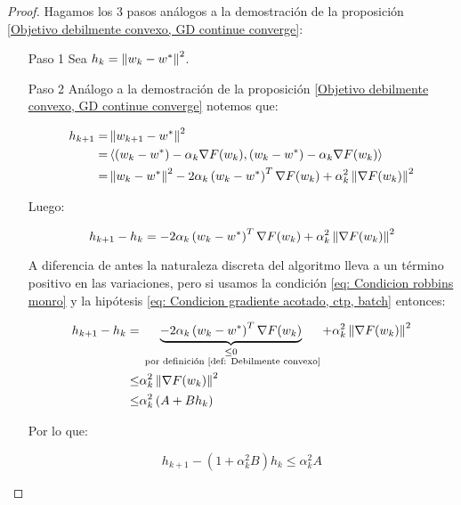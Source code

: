 \begin{proof}
	Hagamos los 3 pasos an\'alogos a la demostraci\'on de la proposici\'on \ref{Objetivo debilmente convexo, GD continue converge}:
	
	\begin{enumerate}
		\item [Paso 1] Sea $h_k = \left\lVert w_k - w^*\right\rVert^2$.
		\item [Paso 2] An\'alogo a la demostraci\'on de la proposici\'on \ref{Objetivo debilmente convexo, GD continue converge} notemos que:
		
		\begin{equation*}
			\begin{aligned}
			h_{k+1} = & \left\lVert w_{k+1} - w^*\right\rVert^2 \\
			 = & \left\langle\left(w_k - w^*\right) - \alpha_k \nabla F(w_k), \left(w_k - w^*\right) - \alpha_k \nabla F(w_k)\right\rangle \\
			 = & \left\lVert w_k - w^*\right\rVert^2 - 2  \alpha_k  \left(w_k - w^*\right)^T\nabla F(w_k) + \alpha_k^2 \left\lVert\nabla F(w_k)\right\rVert^2
			\end{aligned}
		\end{equation*}
		
		Luego:
		
		\begin{equation*}
			h_{k+1} - h_k = -2 \alpha_k \left(w_k - w^* \right)^T\nabla F(w_k) + \alpha_k^2 \left\lVert\nabla F(w_k)\right\rVert^2
		\end{equation*}
		
		A diferencia de antes la naturaleza discreta del algoritmo lleva a un t\'ermino positivo en las variaciones, pero si usamos la condici\'on \ref{eq: Condicion robbins monro} y la hip\'otesis \ref{eq: Condicion gradiente acotado, ctp, batch} entonces:
		
		\begin{equation*}
		\begin{aligned}
			h_{k+1} - h_k = & \underbrace{-2 \alpha_k \left(w_k - w^* \right)^T\nabla F(w_k)}_{\substack{\leq 0 \\ \text{ por definici\'on \ref{def: Debilmente convexo}}}}  + \alpha_k^2 \left\lVert\nabla F(w_k)\right\rVert^2 \\
			\leq & \alpha_k^2 \left\lVert\nabla F(w_k)\right\rVert^2 \\
			\leq & \alpha_k^2 \left(A + B h_k\right)
		\end{aligned}
		\end{equation*}
		
		Por lo que:
		
		\begin{equation}
		\label{eq: Variaciones sucesion lyapunov, objetivo debilmente convexo, incrmentes decrecientes}
			h_{k+1} - \left(1 + \alpha_k^2 B\right)h_k \leq \alpha_k^2A 
		\end{equation}
		

\end{enumerate}
\end{proof}

